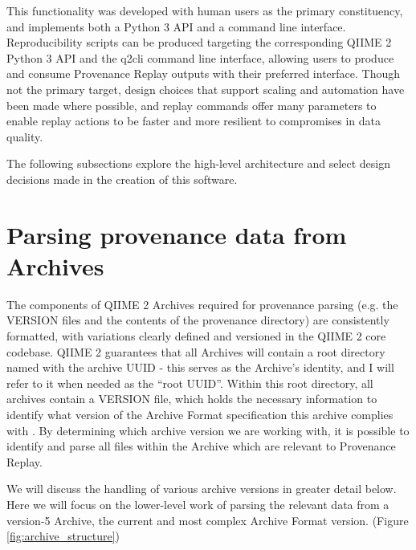 This functionality was developed with human users as the primary constituency,
and implements both a Python 3 API and a command line interface. Reproducibility
scripts can be produced targeting the corresponding QIIME 2 Python 3 API and the
q2cli command line interface, allowing users to produce and consume Provenance
Replay outputs with their preferred interface. Though not the primary target,
design choices that support scaling and automation have been made where
possible, and replay commands offer many parameters to enable replay actions to
be faster and more resilient to compromises in data quality.

The following subsections explore the high-level architecture and select design
decisions made in the creation of this software.

\section{Parsing provenance data from Archives}

The components of QIIME 2 Archives required for provenance parsing (e.g. the
VERSION files and the contents of the provenance directory) are consistently
formatted, with variations clearly defined and versioned in the QIIME 2 core
codebase. QIIME 2 guarantees that all Archives will contain a root directory
named with the archive UUID - this serves as the Archive’s identity, and I will
refer to it when needed as the “root UUID”. Within this root directory, all
archives contain a VERSION file, which holds the necessary information to
identify what version of the Archive Format specification this archive complies
with \parencite{qiime_2_development_team_anatomy_2018}. By determining which
archive version we are working with, it is possible to identify and parse all
files within the Archive which are relevant to Provenance Replay.

We will discuss the handling of various archive versions in greater detail
below. Here we will focus on the lower-level work of parsing the relevant data
from a version-5 Archive, the current and most complex Archive Format version.
(Figure \ref{fig:archive_structure})

